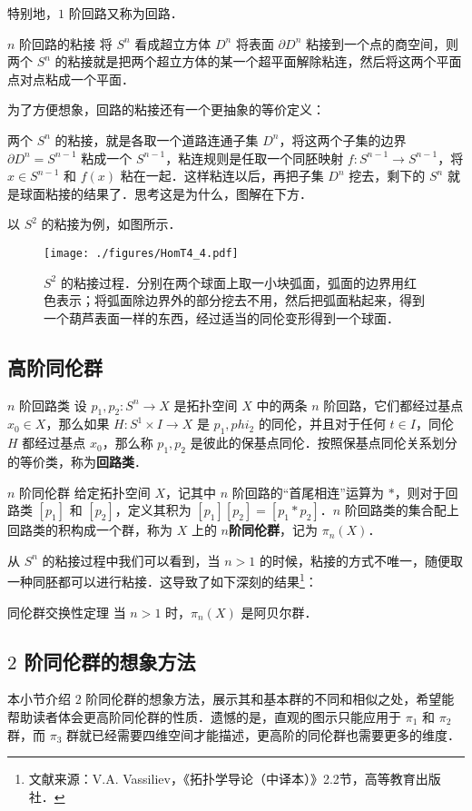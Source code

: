 特别地，$1$ 阶回路又称为回路．

\begin{definition}{$n$ 阶回路的粘接}
将 $S^n$ 看成超立方体 $D^n$ 将表面 $\partial D^n$ 粘接到一个点的商空间，则两个 $S^n$ 的粘接就是把两个超立方体的某一个超平面解除粘连，然后将这两个平面点对点粘成一个平面．
\end{definition}

为了方便想象，回路的粘接还有一个更抽象的等价定义：

\begin{exercise}{}
两个 $S^n$ 的粘接，就是各取一个道路连通子集 $D^n$，将这两个子集的边界 $\partial D^n=S^{n-1}$ 粘成一个 $S^{n-1}$，粘连规则是任取一个同胚映射 $f:S^{n-1}\rightarrow S^{n-1}$，将 $x\in S^{n-1}$ 和 $f(x)$ 粘在一起．这样粘连以后，再把子集 $D^n$ 挖去，剩下的 $S^n$ 就是球面粘接的结果了．思考这是为什么，图解在下方．
\end{exercise}

以 $S^2$ 的粘接为例，如图所示．

\begin{figure}[ht]
\centering
\texttt{[image: ./figures/HomT4\_4.pdf]}
\caption{$S^2$ 的粘接过程．分别在两个球面上取一小块弧面，弧面的边界用红色表示；将弧面除边界外的部分挖去不用，然后把弧面粘起来，得到一个葫芦表面一样的东西，经过适当的同伦变形得到一个球面．} \label{HomT4_fig4}
\end{figure}

\subsection{高阶同伦群}

\begin{definition}{$n$ 阶回路类}
设 $p_1, p_2:S^n\rightarrow X$ 是拓扑空间 $X$ 中的两条 $n$ 阶回路，它们都经过基点 $x_0\in X$，那么如果 $H:S^1\times I\rightarrow X$ 是 $p_1, phi_2$ 的同伦，并且对于任何 $t\in I$，同伦 $H$ 都经过基点 $x_0$，那么称 $p_1, p_2$ 是彼此的保基点同伦．按照保基点同伦关系划分的等价类，称为\textbf{回路类}．
\end{definition}

\begin{definition}{$n$ 阶同伦群}
给定拓扑空间 $X$，记其中 $n$ 阶回路的“首尾相连”运算为 $*$，则对于回路类 $[p_1]$ 和 $[p_2]$，定义其积为 $[p_1][p_2]=[p_1*p_2]$．$n$ 阶回路类的集合配上回路类的积构成一个群，称为 $X$ 上的 $n$\textbf{阶同伦群}，记为 $\pi_n(X)$．
\end{definition}

从 $S^n$ 的粘接过程中我们可以看到，当 $n>1$ 的时候，粘接的方式不唯一，随便取一种同胚都可以进行粘接．这导致了如下深刻的结果\footnote{文献来源：V.A. Vassiliev，《拓扑学导论（中译本）》2.2节，高等教育出版社．}：

\begin{theorem}{同伦群交换性定理}
当 $n>1$ 时，$\pi_n(X)$ 是阿贝尔群．
\end{theorem}

\subsection{$2$ 阶同伦群的想象方法}

本小节介绍 $2$ 阶同伦群的想象方法，展示其和基本群的不同和相似之处，希望能帮助读者体会更高阶同伦群的性质．遗憾的是，直观的图示只能应用于 $\pi_1$ 和 $\pi_2$ 群，而 $\pi_3$ 群就已经需要四维空间才能描述，更高阶的同伦群也需要更多的维度．



